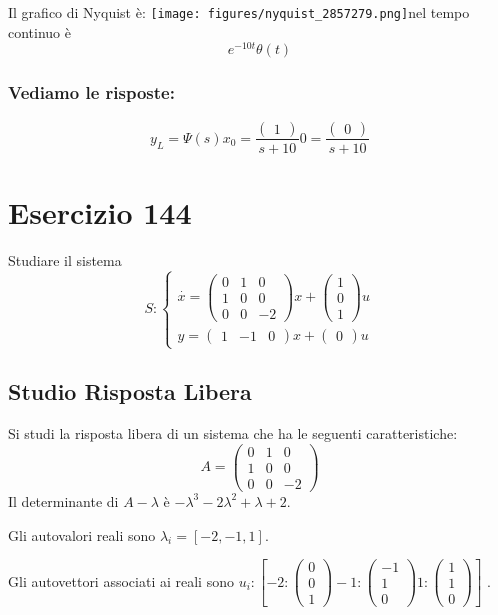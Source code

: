 \documentclass{article}
\begin{document}
Il grafico di Nyquist è:
\texttt{[image: figures/nyquist\_2857279.png]}nel tempo continuo è \[ e^{- 10 t} \theta\left(t\right) \]
\subsubsection{Vediamo le risposte:}
\[ y_L = \Psi(s) x_0 = \frac{\left(\begin{matrix}1\end{matrix}\right)}{s + 10} 0 = \frac{\left(\begin{matrix}0\end{matrix}\right)}{s + 10} \]
 
\section{Esercizio 144 }
 Studiare il sistema \[S:\begin{cases}\overset{\cdot}{x} = \left(\begin{matrix}0 & 1 & 0\\1 & 0 & 0\\0 & 0 & -2\end{matrix}\right) x+ \left(\begin{matrix}1\\0\\1\end{matrix}\right)u\\y = \left(\begin{matrix}1 & -1 & 0\end{matrix}\right) x +\left(\begin{matrix}0\end{matrix}\right) u\end{cases}\]\subsection{Studio Risposta Libera}
Si studi la risposta libera di un sistema che ha le seguenti caratteristiche: \[A = \left(\begin{matrix}0 & 1 & 0\\1 & 0 & 0\\0 & 0 & -2\end{matrix}\right)\]
Il determinante di $A-\lambda$ è $ - \lambda^{3} - 2 \lambda^{2} + \lambda + 2 $.

Gli autovalori reali sono $\lambda_i = [-2, -1, 1]$.

Gli autovettori associati ai reali sono $ u_i: [  -2: \left(\begin{matrix}0\\0\\1\end{matrix}\right)-1: \left(\begin{matrix}-1\\1\\0\end{matrix}\right)1: \left(\begin{matrix}1\\1\\0\end{matrix}\right) ]$
.
\end{document}
